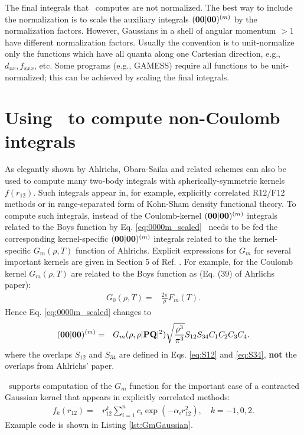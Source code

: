 \documentclass[10pt]{article}
\begin{document}
The final integrals that \LIBINT\ computes are not normalized. The best way to include the normalization
is to scale the auxiliary integrals $({\bf 00}|{\bf 00})^{(m)}$ by the normalization factors.
However, Gaussians in a shell of angular momentum $>1$ have different normalization factors.
Usually the convention is to unit-normalize only the functions which have all
quanta along one Cartesian direction, e.g., $d_{xx}, f_{xxx}$, etc. Some
programs (e.g., GAMESS) require all functions to be unit-normalized;
this can be achieved by scaling the final integrals.

\section{Using \LIBINT\ to compute non-Coulomb integrals}

As elegantly shown by Ahlrichs,\cite{Ahlrichs:2006} Obara-Saika and related schemes can also be used to compute many two-body integrals with spherically-symmetric kernels $f(r_{12})$. Such integrals appear in, for example, explicitly correlated R12/F12 methods or in range-separated form of Kohn-Sham density functional theory. To compute such integrals, instead of the Coulomb-kernel $({\bf 00}|{\bf 00})^{(m)}$ integrals related to the Boys function by Eq. \ref{eq:0000m_scaled} \LIBINT\ needs to be fed the corresponding kernel-specific $({\bf 00}|{\bf 00})^{(m)}$ integrals related to the
the kernel-specific $G_{m}(\rho,T)$ function of Ahlrichs. Explicit expressions for $G_{m}$ for several important kernels are given
in Section 5 of Ref. \cite{Ahlrichs:2006}. For example, for the Coulomb kernel $G_{m}(\rho,T)$ are related to the Boys function as (Eq. (39) of Ahrlichs paper):
\begin{align}
G_{0}(\rho, T) = & \frac{2 \pi}{\rho} F_{m}(T).
\end{align}
Hence Eq. \eqref{eq:0000m_scaled} changes to
\begin{eqnarray} \label{eq:0000m_scaled_Gm}
({\bf 00}|{\bf 00})^{(m)} & = &  G_m(\rho, \rho |{\bf PQ}|^2) \sqrt{\frac{\rho^{3}}{\pi^{3}}}S_{12}S_{34}
C_1 C_2 C_3 C_4 .
\end{eqnarray}
where the overlaps $S_{12}$ and $S_{34}$ are defined in Eqs. \eqref{eq:S12} and \eqref{eq:S34}, {\bf not} the overlaps from Ahlrichs' paper.

\LIBINT\ supports computation of the $G_{m}$ function for the important case of a contracted Gaussian kernel that appears in
explicitly correlated methods:
\begin{align}
f_{k}(r_{12}) = & r_{12}^{k} \sum_{i=1}^{n} c_{i} \exp(- \alpha_{i} r_{12}^{2}) , \quad k=-1,0,2.
\end{align}
Example code is shown in Listing \ref{lst:GmGaussian}.
\end{document}
